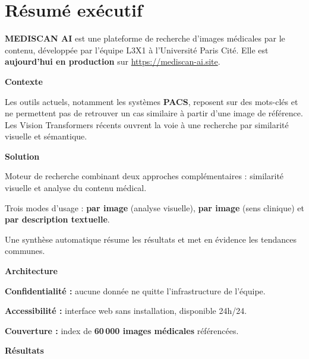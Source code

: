 \documentclass[12pt,a4paper]{article}
\begin{document}
\section*{Résumé exécutif}

\textbf{MEDISCAN AI} est une plateforme de recherche d'images médicales par le contenu,
développée par l'équipe L3X1 à l'Université Paris Cité.
Elle est \textbf{aujourd'hui en production} sur \url{https://mediscan-ai.site}.

\vspace{0.6cm}
\textbf{Contexte}

\vspace{0.15cm}
Les outils actuels, notamment les systèmes \textbf{PACS}, reposent sur des mots-clés
et ne permettent pas de retrouver un cas similaire à partir d'une image de référence.
Les Vision Transformers récents ouvrent la voie à une recherche par similarité visuelle et sémantique.

\vspace{0.6cm}
\textbf{Solution}

\vspace{0.15cm}
\begin{sq}
  \item Moteur de recherche combinant deux approches complémentaires : similarité visuelle et analyse du contenu médical.
  \item Trois modes d'usage : \textbf{par image} (analyse visuelle), \textbf{par image} (sens clinique) et \textbf{par description textuelle}.
  \item Une synthèse automatique résume les résultats et met en évidence les tendances communes.
\end{sq}

\vspace{0.6cm}
\textbf{Architecture}

\vspace{0.15cm}
\begin{sq}
  \item \textbf{Confidentialité :} aucune donnée ne quitte l'infrastructure de l'équipe.
  \item \textbf{Accessibilité :} interface web sans installation, disponible 24h/24.
  \item \textbf{Couverture :} index de \textbf{60\,000 images médicales} référencées.
\end{sq}

\vspace{0.6cm}
\textbf{Résultats}
\end{document}
